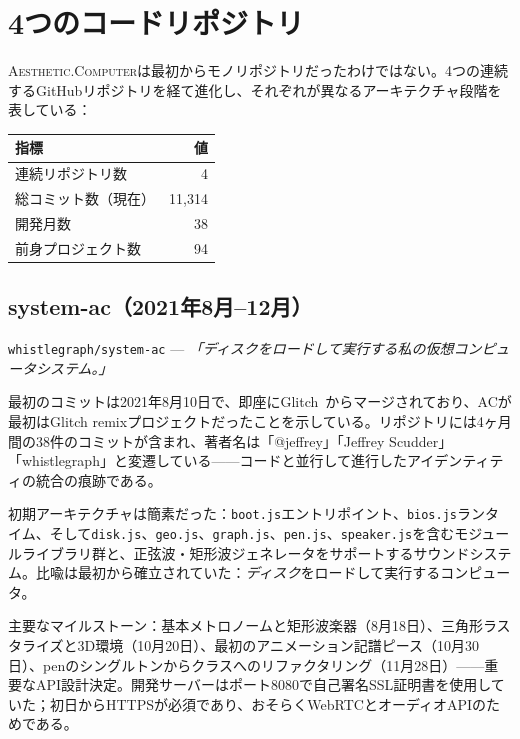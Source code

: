 \documentclass[10pt,letterpaper,twocolumn]{article}
\newcommand{\ac}{\textsc{Aesthetic.Computer}}
\begin{document}

\section{4つのコードリポジトリ}

\ac{}は最初からモノリポジトリだったわけではない。4つの連続するGitHubリポジトリを経て進化し、それぞれが異なるアーキテクチャ段階を表している：

\begin{table}[h]
\small
\centering
\begin{tabular}{lr}
\toprule
\textbf{指標} & \textbf{値} \\
\midrule
連続リポジトリ数 & 4 \\
総コミット数（現在） & 11,314 \\
開発月数 & 38 \\
前身プロジェクト数 & 94 \\
\bottomrule
\end{tabular}
\end{table}

\subsection{system-ac（2021年8月--12月）}

\texttt{whistlegraph/system-ac} --- \emph{「ディスクをロードして実行する私の仮想コンピュータシステム。」}

最初のコミットは2021年8月10日で、即座にGlitch~\citep{glitch2017}からマージされており、ACが最初はGlitch remixプロジェクトだったことを示している。リポジトリには4ヶ月間の38件のコミットが含まれ、著者名は「@jeffrey」「Jeffrey Scudder」「whistlegraph」と変遷している——コードと並行して進行したアイデンティティの統合の痕跡である。

初期アーキテクチャは簡素だった：\texttt{boot.js}エントリポイント、\texttt{bios.js}ランタイム、そして\texttt{disk.js}、\texttt{geo.js}、\texttt{graph.js}、\texttt{pen.js}、\texttt{speaker.js}を含むモジュールライブラリ群と、正弦波・矩形波ジェネレータをサポートするサウンドシステム。比喩は最初から確立されていた：\emph{ディスク}をロードして実行するコンピュータ。

主要なマイルストーン：基本メトロノームと矩形波楽器（8月18日）、三角形ラスタライズと3D環境（10月20日）、最初のアニメーション記譜ピース（10月30日）、penのシングルトンからクラスへのリファクタリング（11月28日）——重要なAPI設計決定。開発サーバーはポート8080で自己署名SSL証明書を使用していた；初日からHTTPSが必須であり、おそらくWebRTCとオーディオAPIのためである。
\end{document}

